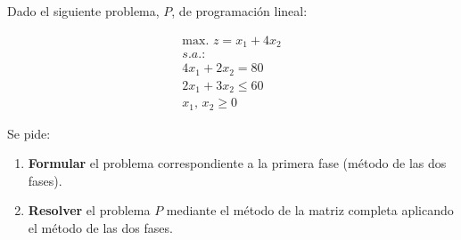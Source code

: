 Dado el siguiente problema, $P$, de programación lineal:

\begin{equation}
\begin{split}
\mbox{max. } z = x_1 + 4x_2\\
s.a.:\\
4x_1 + 2x_2 = 80\\
2x_1 + 3x_2 \leq 60\\
x_1,\,x_2\geq 0
\end{split}
\end{equation}

Se pide:

\begin{enumerate}
    \item \textbf{Formular} el problema correspondiente a la primera fase (método de las dos fases).
    \item \textbf{Resolver} el problema $P$ mediante el método de la matriz completa aplicando el método de las dos fases.
\end{enumerate}

